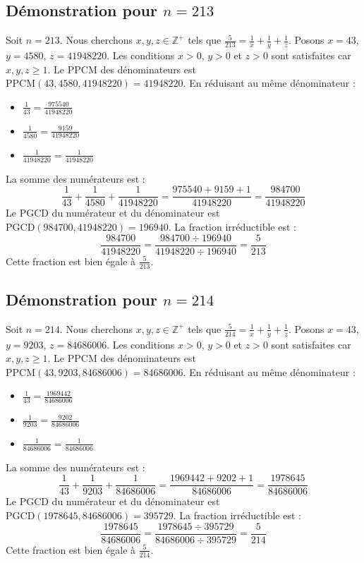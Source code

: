\documentclass[11pt,a4paper]{article}
\begin{document}
\subsection{Démonstration pour $n = 213$}
Soit $n = 213$. Nous cherchons $x, y, z \in \mathbb{Z}^{+}$ tels que $\frac{5}{213} = \frac{1}{x} + \frac{1}{y} + \frac{1}{z}$.
Posons $x = 43$, $y = 4580$, $z = 41948220$.
Les conditions $x > 0$, $y > 0$ et $z > 0$ sont satisfaites car $x, y, z \geq 1$.
Le PPCM des dénominateurs est $\text{PPCM}(43, 4580, 41948220) = 41948220$.
En réduisant au même dénominateur :
\begin{itemize}
    \item $\frac{1}{43} = \frac{975540}{41948220}$
    \item $\frac{1}{4580} = \frac{9159}{41948220}$
    \item $\frac{1}{41948220} = \frac{1}{41948220}$
\end{itemize}
La somme des numérateurs est :
$$ \frac{1}{43} + \frac{1}{4580} + \frac{1}{41948220} = \frac{975540 + 9159 + 1}{41948220} = \frac{984700}{41948220} $$
Le PGCD du numérateur et du dénominateur est $\text{PGCD}(984700, 41948220) = 196940$.
La fraction irréductible est :
$$ \frac{984700}{41948220} = \frac{984700 \div 196940}{41948220 \div 196940} = \frac{5}{213} $$
Cette fraction est bien égale à $\frac{5}{213}$.

\subsection{Démonstration pour $n = 214$}
Soit $n = 214$. Nous cherchons $x, y, z \in \mathbb{Z}^{+}$ tels que $\frac{5}{214} = \frac{1}{x} + \frac{1}{y} + \frac{1}{z}$.
Posons $x = 43$, $y = 9203$, $z = 84686006$.
Les conditions $x > 0$, $y > 0$ et $z > 0$ sont satisfaites car $x, y, z \geq 1$.
Le PPCM des dénominateurs est $\text{PPCM}(43, 9203, 84686006) = 84686006$.
En réduisant au même dénominateur :
\begin{itemize}
    \item $\frac{1}{43} = \frac{1969442}{84686006}$
    \item $\frac{1}{9203} = \frac{9202}{84686006}$
    \item $\frac{1}{84686006} = \frac{1}{84686006}$
\end{itemize}
La somme des numérateurs est :
$$ \frac{1}{43} + \frac{1}{9203} + \frac{1}{84686006} = \frac{1969442 + 9202 + 1}{84686006} = \frac{1978645}{84686006} $$
Le PGCD du numérateur et du dénominateur est $\text{PGCD}(1978645, 84686006) = 395729$.
La fraction irréductible est :
$$ \frac{1978645}{84686006} = \frac{1978645 \div 395729}{84686006 \div 395729} = \frac{5}{214} $$
Cette fraction est bien égale à $\frac{5}{214}$.
\end{document}
